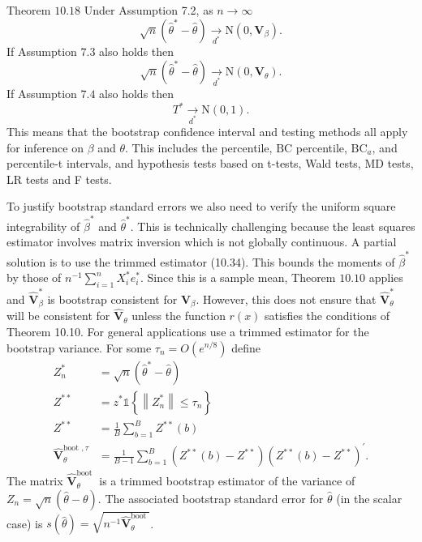 \documentclass[10pt]{article}
\begin{document}
Theorem $10.18$ Under Assumption 7.2, as $n \rightarrow \infty$
$$
\sqrt{n}\left(\widehat{\theta}^{*}-\widehat{\theta}\right) \underset{d^{*}}{\longrightarrow} \mathrm{N}\left(0, \boldsymbol{V}_{\beta}\right) .
$$
If Assumption $7.3$ also holds then
$$
\sqrt{n}\left(\widehat{\theta}^{*}-\widehat{\theta}\right) \underset{d^{*}}{\longrightarrow} \mathrm{N}\left(0, \boldsymbol{V}_{\theta}\right) .
$$
If Assumption $7.4$ also holds then
$$
T^{*} \underset{d^{*}}{\longrightarrow} \mathrm{N}(0,1) .
$$
This means that the bootstrap confidence interval and testing methods all apply for inference on $\beta$ and $\theta$. This includes the percentile, $\mathrm{BC}$ percentile, $\mathrm{BC}_{a}$, and percentile-t intervals, and hypothesis tests based on t-tests, Wald tests, MD tests, LR tests and F tests.

To justify bootstrap standard errors we also need to verify the uniform square integrability of $\widehat{\beta}^{*}$ and $\widehat{\theta}^{*}$. This is technically challenging because the least squares estimator involves matrix inversion which is not globally continuous. A partial solution is to use the trimmed estimator (10.34). This bounds the moments of $\widehat{\beta}^{*}$ by those of $n^{-1} \sum_{i=1}^{n} X_{i}^{*} e_{i}^{*}$. Since this is a sample mean, Theorem $10.10$ applies and $\widehat{\boldsymbol{V}}_{\beta}^{*}$ is bootstrap consistent for $\boldsymbol{V}_{\beta}$. However, this does not ensure that $\widehat{\boldsymbol{V}}_{\theta}^{*}$ will be consistent for $\widehat{\boldsymbol{V}}_{\theta}$ unless the function $r(x)$ satisfies the conditions of Theorem 10.10. For general applications use a trimmed estimator for the bootstrap variance. For some $\tau_{n}=O\left(e^{n / 8}\right)$ define
$$
\begin{aligned}
Z_{n}^{*} &=\sqrt{n}\left(\widehat{\theta}^{*}-\widehat{\theta}\right) \\
Z^{* *} &=z^{*} \mathbb{1}\left\{\left\|Z_{n}^{*}\right\| \leq \tau_{n}\right\} \\
Z^{* *} &=\frac{1}{B} \sum_{b=1}^{B} Z^{* *}(b) \\
\widehat{\mathbf{V}}_{\theta}^{\text {boot }, \tau} &=\frac{1}{B-1} \sum_{b=1}^{B}\left(Z^{* *}(b)-Z^{* *}\right)\left(Z^{* *}(b)-Z^{* *}\right)^{\prime} .
\end{aligned}
$$
The matrix $\widehat{\boldsymbol{V}}_{\theta}^{\text {boot }}$ is a trimmed bootstrap estimator of the variance of $Z_{n}=\sqrt{n}(\widehat{\theta}-\theta)$. The associated bootstrap standard error for $\widehat{\theta}$ (in the scalar case) is $s(\widehat{\theta})=\sqrt{n^{-1} \widehat{\boldsymbol{V}}_{\theta}^{\text {boot }}}$.
\end{document}
